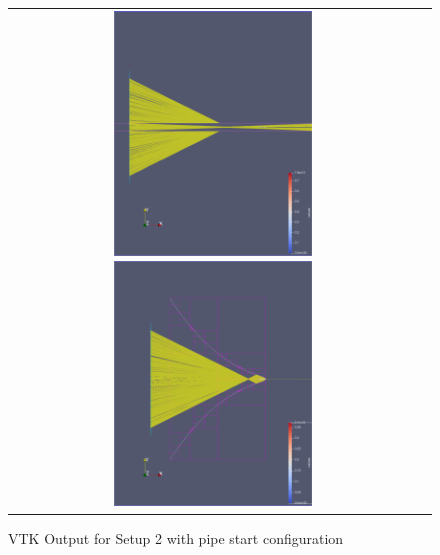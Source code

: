 \documentclass[a4paper,10pt]{article}
\begin{document}
    \begin{figure}
        \centering
        \begin{tabular}{c c}
        \includegraphics[width=0.5\textwidth]{images/open_pipe/start.png}
        \includegraphics[width=0.5\textwidth]{images/open_pipe/0.png}
        \end{tabular}
        \label{fig:setup2_pipe}
        \caption[VTK Output for Setup 2 with pipe start configuration]{
            VTK Output for Setup 2 with pipe start configuration
            }
    \end{figure}
\end{document}

